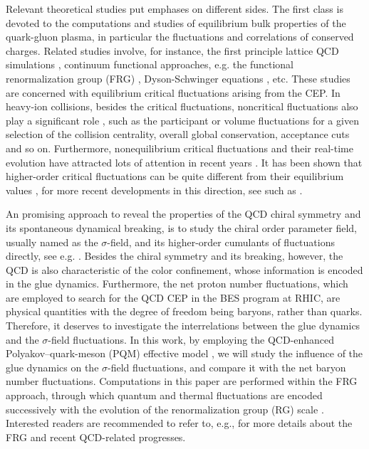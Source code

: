 \documentclass[final,5p,times,twocolumn,colorlinks=true,citecolor=blue,linkcolor=blue]{elsarticle}
\begin{document}
Relevant theoretical studies put emphases on different sides. The first class is devoted to the computations and studies of equilibrium bulk properties of the quark-gluon plasma, in particular the fluctuations and correlations of conserved charges. Related studies involve, for instance, the first principle lattice QCD simulations \cite{Borsanyi:2013hza,Bellwied:2015lba,Ding:2015fca,Karsch:2017zzw,Bazavov:2017tot}, continuum functional approaches, e.g. the functional renormalization group (FRG) \cite{Fu:2015naa,Fu:2015amv,Fu:2016tey}, Dyson-Schwinger equations \cite{Qin:2010nq,Xin:2014ela,Gao:2016qkh}, etc. These studies are concerned with equilibrium critical fluctuations arising from the CEP. In heavy-ion collisions, besides the critical fluctuations, noncritical fluctuations also play a significant role \cite{Braun-Munzinger:2016yjz,Xu:2016skm,Li:2017via}, such as the participant or volume fluctuations for a given selection of the collision centrality, overall global conservation, acceptance cuts and so on. Furthermore, nonequilibrium critical fluctuations and their real-time evolution have attracted lots of attention in recent years \cite{Mukherjee:2015swa,Jiang:2015hri,Mukherjee:2016kyu,Jiang:2017sni}. It has been shown that higher-order critical fluctuations can be quite different from their equilibrium values \cite{Mukherjee:2015swa}, for more recent developments in this direction, see such as \cite{Stephanov:2017wlw,Stephanov:2017ghc}.

An promising approach to reveal the properties of the QCD chiral symmetry and its spontaneous dynamical breaking, is to study the chiral order parameter field, usually named as the $\sigma$-field, and its higher-order cumulants of fluctuations directly, see e.g. \cite{Stephanov:1999zu,Mukherjee:2015swa}. Besides the chiral symmetry and its breaking, however, the QCD is also characteristic of the color confinement, whose information is encoded in the glue dynamics. Furthermore, the net proton number fluctuations, which are employed to search for the QCD CEP in the BES program at RHIC, are physical quantities with the degree of freedom being baryons, rather than quarks. Therefore, it deserves to investigate the interrelations between the glue dynamics and the $\sigma$-field fluctuations. In this work, by employing the QCD-enhanced Polyakov--quark-meson (PQM) effective model \cite{Fu:2015naa}, we will study the influence of the glue dynamics on the $\sigma$-field fluctuations, and compare it with the net baryon number fluctuations. Computations in this paper are performed within the FRG approach, through which quantum and thermal fluctuations are encoded successively with the evolution of the renormalization group (RG) scale \cite{Wetterich:1992yh}. Interested readers are recommended to refer to, e.g., \cite{Pawlowski:2005xe,Pawlowski:2014aha,Pawlowski:2014zaa,Helmboldt:2014iya,Mitter:2014wpa,Braun:2014ata,Rennecke:2015eba,Fu:2015naa,Fu:2015amv,Wang:2015bky,Cyrol:2016tym,Fu:2016tey,Rennecke:2016tkm,Cyrol:2017ewj,Cyrol:2017qkl,Wang:2017vis,Fu:2017vvg} for more details about the FRG and recent QCD-related progresses.
\end{document}
